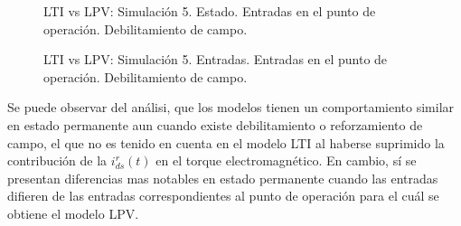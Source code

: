 \documentclass[a4paper, 10pt, onecolumn,journal]{ieeeconf}
\begin{document}
\begin{figure}[thpb]
	\centering
	\begin{adjustbox}{max width=\columnwidth}
	\end{adjustbox}
	\caption{LTI vs LPV: Simulación 5. Estado. Entradas en el punto de operación. Debilitamiento de campo.}
	\label{simulación 5 estado}
\end{figure}

\begin{figure}[thpb]
	\centering
	\begin{adjustbox}{max width=\columnwidth}
	\end{adjustbox}
	\caption{LTI vs LPV: Simulación 5. Entradas. Entradas en el punto de operación. Debilitamiento de campo.}
	\label{simulación 5 entradas}
\end{figure}

Se puede observar del análisi, que los modelos tienen un comportamiento
similar en estado permanente aun cuando existe debilitamiento o reforzamiento de campo, el que no es tenido en cuenta
en el modelo LTI al haberse suprimido la contribución de la $i^r_{ds}(t)$ en el torque electromagnético.
En cambio, sí se presentan diferencias mas notables en estado permanente cuando las entradas difieren de las entradas correspondientes al 
punto de operación para el cuál se obtiene el modelo LPV.
\end{document}
